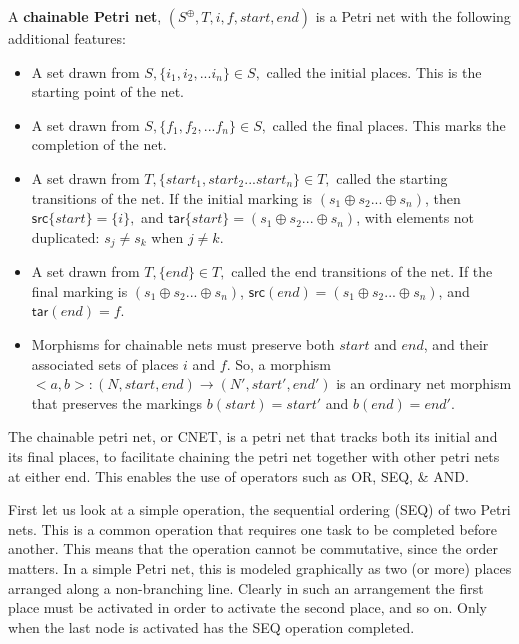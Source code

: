 \begin{definition}
  \label{Chainable-Petri-Net}
  A \textbf{chainable Petri net}, $(S^\oplus, T, i, f, start, end)$ is a Petri net with the following additional features: 
  \begin{itemize}
  \item A set drawn from $S, \{i_1, i_2, ... i_n\} \in S,$ called the initial places. This is the starting point of the net.
  \item A set drawn from $S, \{f_1, f_2, ... f_n\} \in S,$ called the final places. This marks the completion of the net.
  \item A set drawn from $T, \{start_1, start_2... start_n\} \in T,$ called the starting transitions of the net. If the initial marking is $(s_1 \oplus s_2 ... \oplus s_n)$, then $\mathsf{src}\{start\} = \{i\},$ and $\mathsf{tar}\{start\} = (s_1 \oplus s_2 ... \oplus s_n)$, with elements not duplicated: $s_j \neq s_k$ when $j \neq k$. %
  \item A set drawn from $T, \{end\} \in T,$ called the end transitions of the net. If the final marking is $(s_1 \oplus s_2 ... \oplus s_n)$, $\mathsf{src}(end) = (s_1 \oplus s_2 ... \oplus s_n)$, and $\mathsf{tar}(end) = f$. 
   \item Morphisms for chainable nets must preserve both $start$ and $end$, and their associated sets of places $i$ and $f$. So, a morphism $<a,b>: (N, start, end) \to (N', start', end')$ is an ordinary net morphism that preserves the markings $b(start) = start'$ and $b(end) = end'$. 
 \end{itemize}
\end{definition}
The chainable petri net, or CNET, is a petri net that tracks both its initial and its final places, to facilitate chaining the petri net together with other petri nets at either end. This enables the use of operators such as OR, SEQ, \& AND.\\
\begin{example}
  \label{ex:SEQ-PN}
First let us look at a simple operation, the sequential ordering (SEQ) of two Petri nets. This is a common operation that requires one task to be completed before another. This means that the operation cannot be commutative, since the order matters. In a simple Petri net, this is modeled graphically as two (or more) places arranged along a non-branching line. Clearly in such an arrangement the first place must be activated in order to activate the second place, and so on. Only when the last node is activated has the SEQ operation completed.    
\end{example}
